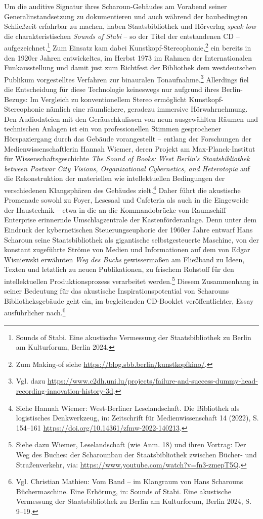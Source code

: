 \documentclass[a4paper,
fontsize=11pt,
oneside,
numbers=noperiodatend,
parskip=half-,
bibliography=totoc,
final
]{scrartcl}
\begin{document}
Um die auditive Signatur ihres Scharoun-Gebäudes am Vorabend seiner
Generalinstandsetzung zu dokumentieren und auch während der baubedingten
Schließzeit erfahrbar zu machen, haben Staatsbibliothek und Hörverlag
\emph{speak low} die charakteristischen \emph{Sounds of Stabi} -- so der
Titel der entstandenen CD -- aufgezeichnet.\footnote{Sounds of Stabi.
  Eine akustische Vermessung der Staatsbibliothek zu Berlin am
  Kulturforum, Berlin 2024.} Zum Einsatz kam dabei
Kunstkopf-Stereophonie,\footnote{Zum Making-of siehe
  \url{https://blog.sbb.berlin/kunstkopfkino/}.} ein bereits in den
1920er Jahren entwickeltes, im Herbst 1973 im Rahmen der Internationalen
Funkausstellung und damit just zum Richtfest der Bibliothek dem
westdeutschen Publikum vorgestelltes Verfahren zur binauralen
Tonaufnahme.\footnote{Vgl. dazu
  \url{https://www.c2dh.uni.lu/projects/failure-and-success-dummy-head-recording-innovation-history-3d}.}
Allerdings fiel die Entscheidung für diese Technologie keineswegs nur
aufgrund ihres Berlin-Bezugs: Im Vergleich zu konventionellem Stereo
ermöglicht Kunstkopf-Stereophonie nämlich eine räumlichere, geradezu
immersive Hörwahrnehmung. Den Audiodateien mit den Geräuschkulissen von
neun ausgewählten Räumen und technischen Anlagen ist ein von
professionellen Stimmen gesprochener Hörspaziergang durch das Gebäude
vorangestellt -- entlang der Forschungen der Medienwissenschaftlerin
Hannah Wiemer, deren Projekt am Max-Planck-Institut für
Wissenschaftsgeschichte \emph{The Sound of Books: West Berlin's
Staatsbibliothek between Postwar City Visions, Organizational
Cybernetics, and Heterotopia} auf die Rekonstruktion der materiellen wie
intellektuellen Bedingungen der verschiedenen Klangsphären des Gebäudes
zielt.\footnote{Siehe Hannah Wiemer: West-Berliner Leselandschaft. Die
  Bibliothek als logistisches Denkwerkzeug, in: Zeitschrift für
  Medienwissenschaft 14 (2022), S. 154--161
  \url{https://doi.org/10.14361/zfmw-2022-140213}.} Daher führt die
akustische Promenade sowohl zu Foyer, Lesesaal und Cafeteria als auch in
die Eingeweide der Haustechnik -- etwa in die an die Kommandobrücke von
Raumschiff Enterprise erinnernde Umschlagzentrale der
Kastenförderanlage. Denn unter dem Eindruck der kybernetischen
Steuerungseuphorie der 1960er Jahre entwarf Hans Scharoun seine
Staatsbibliothek als gigantische selbstgesteuerte Maschine, von der
konstant zugeführte Ströme von Medien und Informationen auf dem von
Edgar Wisniewski erwähnten \emph{Weg des Buchs} gewissermaßen am
Fließband zu Ideen, Texten und letztlich zu neuen Publikationen, zu
frischem Rohstoff für den intellektuellen Produktionsprozess verarbeitet
werden.\footnote{Siehe dazu Wiemer, Leselandschaft (wie Anm. 18) und
  ihren Vortrag: Der Weg des Buches: der Scharounbau der
  Staatsbibliothek zwischen Bücher- und Straßenverkehr, via:
  \url{https://www.youtube.com/watch?v=fn3-zmepT5Q}.} Diesem
Zusammenhang in seiner Bedeutung für das akustische
Inspirationspotential von Scharouns Bibliotheksgebäude geht ein, im
begleitenden CD-Booklet veröffentlichter, Essay ausführlicher
nach.\footnote{Vgl. Christian Mathieu: Vom Band -- im Klangraum von Hans
  Scharouns Büchermaschine. Eine Erhörung, in: Sounds of Stabi. Eine
  akustische Vermessung der Staatsbibliothek zu Berlin am Kulturforum,
  Berlin 2024, S. 9--19.}
\end{document}
